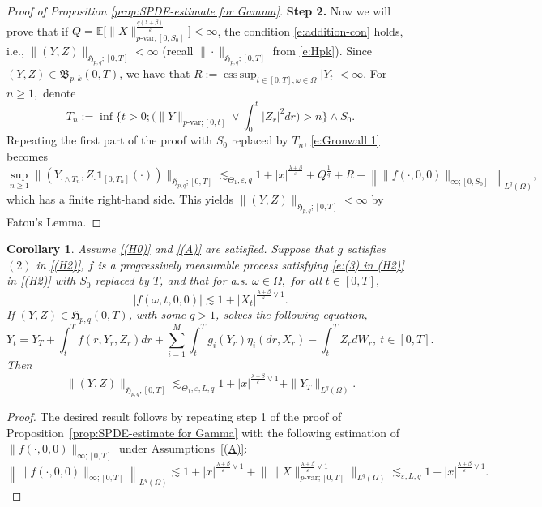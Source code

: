 \documentclass[11pt,reqno]{amsart}
\newtheorem{corollary}{Corollary}[section]
\DeclareMathOperator*{\esssup}{ess\,sup}
\numberwithin{equation}{section}
\begin{document}
\begin{proof}[Proof of Proposition \ref{prop:SPDE-estimate for Gamma}]
{\bf Step 2.} Now we will prove that if $Q=\mathbb{E}\Big[\|X\|^{\frac{q(\lambda + \beta)}{\varepsilon}}_{p\text{-var};[0,S_{0}]}\Big]<\infty$, the condition \eqref{e:addition-con} holds, i.e., $\|(Y,Z)\|_{\mathfrak{H}_{p,q};[0,T]}<\infty$ (recall $\|\cdot\|_{\mathfrak{H}_{p,q};[0,T]}$ from \eqref{e:Hpk}).  Since $(Y,Z)\in\mathfrak{B}_{p,k}(0,T)$, we have that $R:=\esssup_{t\in[0,T],\omega\in\Omega}|Y_{t}|<\infty.$ For $n\ge 1,$ denote 
\[T_{n} := \inf\Big\{t>0;\Big(\|Y\|_{p\text{-var};[0,t]}\vee \int_{0}^{t}|Z_{r}|^{2}dr\Big) > n\Big\}\land S_{0}.\] 
Repeating the first part of the proof with $S_{0}$ replaced by $T_{n}$, \eqref{e:Gronwall 1} becomes
\[\sup_{n\ge 1}\|\left(Y_{\cdot\land T_{n}},Z_{\cdot} \mathbf{1}_{[0,T_{n}]}(\cdot)\right)\|_{\mathfrak{H}_{p,q};[0,T]}\lesssim_{\Theta_{1},\varepsilon,q} 1 + |x|^{\frac{\lambda+\beta}{\varepsilon}} + Q^{\frac{1}{q}} + R  + \left\|\|f(\cdot,0,0)\|_{\infty;[0,S_{0}]}\right\|_{L^{q}(\Omega)},\]
which has a finite right-hand side. This yields  $\|(Y,Z)\|_{\mathfrak{H}_{p,q};[0,T]}<\infty$ by Fatou's Lemma.		
\end{proof}

\begin{corollary}\label{cor:growth of the solution-unbounded}
Assume \ref{(H0)} and \ref{(A)} are satisfied. Suppose that $g$ satisfies $(2)$ in \ref{(H2)}, $f$ is a progressively measurable process satisfying \eqref{e:(3) in (H2)} in \ref{(H2)} with $S_0$ replaced by $T$,
and that for a.s. $\omega\in\Omega,$ for all $t\in[0,T],$
\[|f(\omega,t,0,0)|\lesssim 1 + |X_{t}|^{\frac{\lambda+\beta}{\varepsilon}\vee 1}.\]
If $(Y,Z)\in\mathfrak{H}_{p,q}(0,T)$, with some $q>1$, solves the following equation,
\begin{equation}\label{e:limit BSDE}
Y_{t} = Y_{T} + \int_{t}^{T}f(r,Y_r,Z_r)dr + \sum_{i=1}^{M}\int_{t}^{T}g_{i}(Y_{r})\eta_{i}(dr,X_{r}) - \int_{t}^{T}Z_{r}dW_{r},\ t\in[0,T].
\end{equation} 
Then
\[\|(Y,Z)\|_{\mathfrak{H}_{p,q};[0,T]}\lesssim_{\Theta_{1},\varepsilon,L,q} 1 + |x|^{\frac{\lambda+\beta}{\varepsilon}\vee 1} + \|Y_{T}\|_{L^{q}(\Omega)}.\]
\end{corollary}
\begin{proof}
The desired result follows by repeating step 1 of the proof of Proposition~\ref{prop:SPDE-estimate for Gamma} with the following estimation of $\|f(\cdot,0,0)\|_{\infty;[0,T]}$ under Assumptions~\ref{(A)}:
\[\left\|\|f(\cdot,0,0)\|_{\infty;[0,T]}\right\|_{L^{q}(\Omega)}\lesssim 1 + |x|^{\frac{\lambda+\beta}{\varepsilon}\vee 1} +  \Big\|\|X\|^{\frac{\lambda+\beta}{\varepsilon}\vee 1}_{p\text{-var};[0,T]}\Big\|_{L^{q}(\Omega)}\lesssim_{\varepsilon,L,q} 1 + |x|^{\frac{\lambda+\beta}{\varepsilon}\vee 1}.\]
\end{proof}
\end{document}
